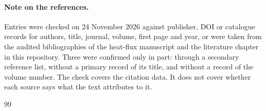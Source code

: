 \paragraph{Note on the references.} Entries were checked on 24 November 2026 against publisher, DOI or
catalogue records for authors, title, journal, volume, first page and year,
or were taken from the audited bibliographies of the heat-flux manuscript
and the literature chapter in this repository. Three were confirmed only in
part: \cite{Bobylev82} through a secondary reference list,
\cite{VVS62} without a primary record of its title, and
\cite{Lanford75} without a record of the volume number. The check covers
the citation data. It does not cover whether each source says what the
text attributes to it.

\begin{thebibliography}{99}


\end{thebibliography}
